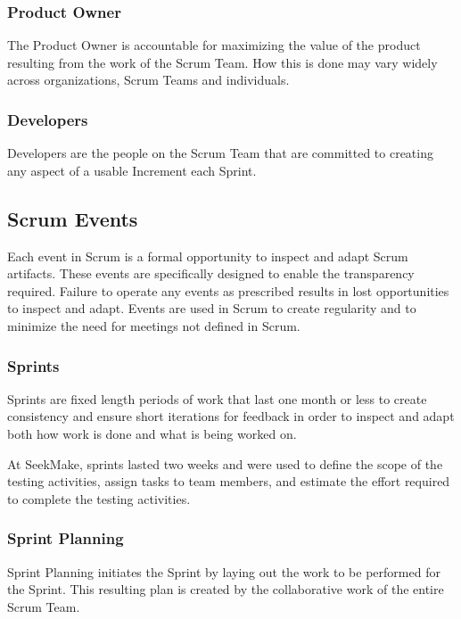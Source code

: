 \subsubsection{Product Owner}
The Product Owner is accountable for maximizing the value of the product resulting from the work of the Scrum Team. How this is done may vary widely across organizations, Scrum Teams and individuals. \cite{scrum}

\subsubsection{Developers}
Developers are the people on the Scrum Team that are committed to creating any aspect of a usable Increment each Sprint.\cite{scrum}

\subsection{Scrum Events}

Each event in Scrum is a formal opportunity to inspect and adapt Scrum artifacts. These events are specifically designed to enable the transparency required. Failure to operate any events as prescribed results in lost opportunities to inspect and adapt. Events are used in Scrum to create regularity and to minimize the need for meetings not defined in Scrum. \cite{scrum}

\subsubsection{Sprints}

Sprints are fixed length periods of work that last one month or less to create consistency and ensure short iterations for feedback in order to inspect and adapt both how work is done and what is being worked on. \cite{scrum}

At SeekMake, sprints lasted two weeks and were used to define the scope of the testing activities, assign tasks to team members, and estimate the effort required to complete the testing activities.

\subsubsection{Sprint Planning}

Sprint Planning initiates the Sprint by laying out the work to be performed for the Sprint. This resulting plan is created by the collaborative work of the entire Scrum Team. \cite{scrum}

